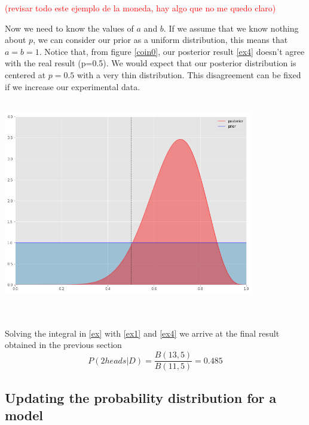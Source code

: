 \documentclass[onecolumn,           %
               showpacs,            %
               preprintnumbers,     %
               aps,                 %
               prl,          	    %
               letterpaper,             %
               superscriptaddress,      %
               nofootinbib,         %
               tightenlines,        %
               floats,floatfix      %
               ,usenatbib,
               ]{revtex4-1}
\begin{document}
\textcolor{red}{(revisar todo este ejemplo de la moneda, hay algo que no me quedo claro)}

Now we need to know the values of $a$ and $b$. If we assume that we know nothing about $p$, we can consider our prior as a uniform distribution, this means that $a=b=1$. 
Notice that, from figure \ref{coin0}, our posterior result \eqref{ex4} doesn't agree with the real result (p=0.5). We would expect that our posterior distribution is centered at $p=0.5$ with a very thin distribution. This disagreement can be fixed if we increase our experimental data.\\ $ $\\
\begin{minipage}{\textwidth}
\centering
\includegraphics[height=8cm]{Figures/coin0.png}
\label{coin0}
\end{minipage}
\\$ $ \\
Solving the integral in \eqref{ex} with \eqref{ex1} and \eqref{ex4} we arrive at the final result obtained in the previous section
\begin{equation}
P(2heads|D)=\frac{B(13,5)}{B(11,5)}=0.485
\end{equation}
%
%
%
\subsection{Updating the probability distribution for a model} 
\end{document}
